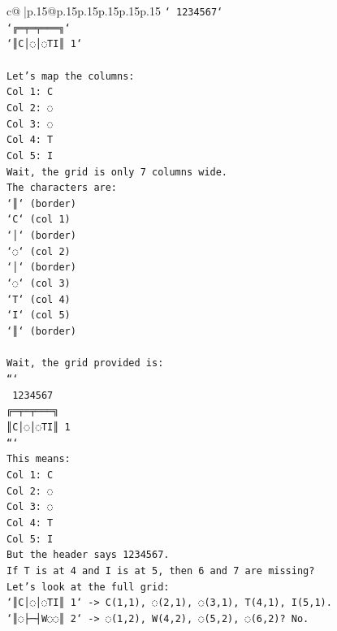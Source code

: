 \documentclass{article}
\begin{document}
{\begin{supertabular}{c@{$\;$}|p{.15\linewidth}@{}p{.15\linewidth}p{.15\linewidth}p{.15\linewidth}p{.15\linewidth}p{.15\linewidth}}
{{{\texttt{` 1234567`} \\
\texttt{`╔═╤═╤═══╗`} \\
\texttt{`║C│◌│◌TI║ 1`} \\
\\ 
\texttt{Let's map the columns:} \\
\texttt{Col 1: C} \\
\texttt{Col 2: ◌} \\
\texttt{Col 3: ◌} \\
\texttt{Col 4: T} \\
\texttt{Col 5: I} \\
\texttt{Wait, the grid is only 7 columns wide.} \\
\texttt{The characters are:} \\
\texttt{`║` (border)} \\
\texttt{`C` (col 1)} \\
\texttt{`│` (border)} \\
\texttt{`◌` (col 2)} \\
\texttt{`│` (border)} \\
\texttt{`◌` (col 3)} \\
\texttt{`T` (col 4)} \\
\texttt{`I` (col 5)} \\
\texttt{`║` (border)} \\
\\ 
\texttt{Wait, the grid provided is:} \\
\texttt{```} \\
\texttt{ 1234567} \\
\texttt{╔═╤═╤═══╗} \\
\texttt{║C│◌│◌TI║ 1} \\
\texttt{```} \\
\texttt{This means:} \\
\texttt{Col 1: C} \\
\texttt{Col 2: ◌} \\
\texttt{Col 3: ◌} \\
\texttt{Col 4: T} \\
\texttt{Col 5: I} \\
\texttt{But the header says 1234567.} \\
\texttt{If T is at 4 and I is at 5, then 6 and 7 are missing?} \\
\texttt{Let's look at the full grid:} \\
\texttt{`║C│◌│◌TI║ 1` {-}> C(1,1), ◌(2,1), ◌(3,1), T(4,1), I(5,1).} \\
\texttt{`║◌├─┤W◌◌║ 2` {-}> ◌(1,2), W(4,2), ◌(5,2), ◌(6,2)? No.} \\
}}}
\end{supertabular}}
\end{document}
